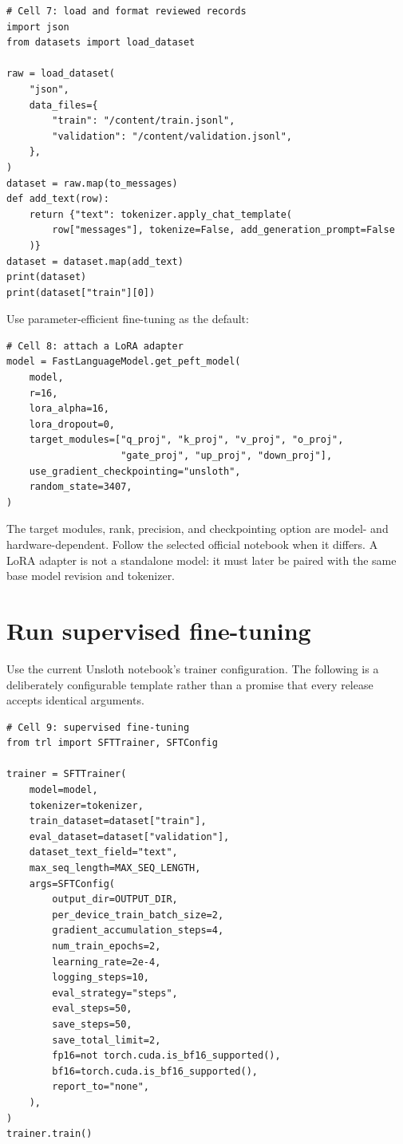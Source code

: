 \documentclass[11pt,oneside]{book}
\begin{document}
\begin{verbatim}
# Cell 7: load and format reviewed records
import json
from datasets import load_dataset

raw = load_dataset(
    "json",
    data_files={
        "train": "/content/train.jsonl",
        "validation": "/content/validation.jsonl",
    },
)
dataset = raw.map(to_messages)
def add_text(row):
    return {"text": tokenizer.apply_chat_template(
        row["messages"], tokenize=False, add_generation_prompt=False
    )}
dataset = dataset.map(add_text)
print(dataset)
print(dataset["train"][0])
\end{verbatim}

Use parameter-efficient fine-tuning as the default:

\begin{verbatim}
# Cell 8: attach a LoRA adapter
model = FastLanguageModel.get_peft_model(
    model,
    r=16,
    lora_alpha=16,
    lora_dropout=0,
    target_modules=["q_proj", "k_proj", "v_proj", "o_proj",
                    "gate_proj", "up_proj", "down_proj"],
    use_gradient_checkpointing="unsloth",
    random_state=3407,
)
\end{verbatim}

The target modules, rank, precision, and checkpointing option are model- and hardware-dependent. Follow the selected official notebook when it differs. A LoRA adapter is not a standalone model: it must later be paired with the same base model revision and tokenizer.

\section{Run supervised fine-tuning}

Use the current Unsloth notebook's trainer configuration. The following is a deliberately configurable template rather than a promise that every release accepts identical arguments.

\begin{verbatim}
# Cell 9: supervised fine-tuning
from trl import SFTTrainer, SFTConfig

trainer = SFTTrainer(
    model=model,
    tokenizer=tokenizer,
    train_dataset=dataset["train"],
    eval_dataset=dataset["validation"],
    dataset_text_field="text",
    max_seq_length=MAX_SEQ_LENGTH,
    args=SFTConfig(
        output_dir=OUTPUT_DIR,
        per_device_train_batch_size=2,
        gradient_accumulation_steps=4,
        num_train_epochs=2,
        learning_rate=2e-4,
        logging_steps=10,
        eval_strategy="steps",
        eval_steps=50,
        save_steps=50,
        save_total_limit=2,
        fp16=not torch.cuda.is_bf16_supported(),
        bf16=torch.cuda.is_bf16_supported(),
        report_to="none",
    ),
)
trainer.train()
\end{verbatim}
\end{document}
